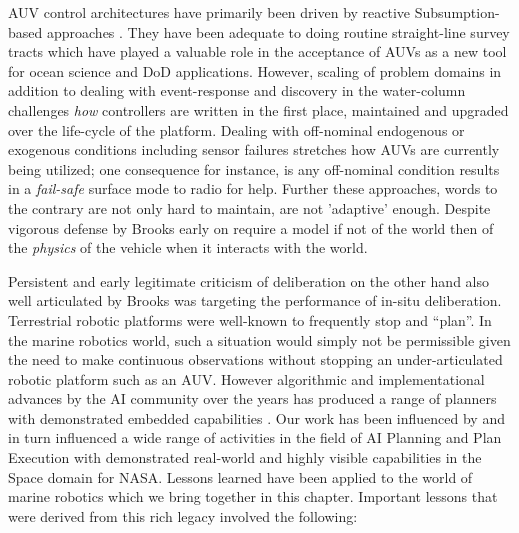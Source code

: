 AUV control architectures have primarily been driven by reactive
Subsumption-based approaches \cite{brooks86}. They have been adequate
to doing routine straight-line survey tracts which have played a
valuable role in the acceptance of AUVs as a new tool for ocean
science and DoD applications. However, scaling of problem domains in
addition to dealing with event-response and discovery in the
water-column challenges \emph{how} controllers are written in the
first place, maintained and upgraded over the life-cycle of the
platform. Dealing with off-nominal endogenous or exogenous conditions
including sensor failures stretches how AUVs are currently being
utilized; one consequence for instance, is any off-nominal condition
results in a \emph{fail-safe} surface mode to radio for help. Further
these approaches, words to the contrary are not only hard to maintain,
are not 'adaptive' enough. Despite vigorous defense by Brooks early on
\cite{Brooks91intelligencewithoutrea,Brooks91intelligencewithoutrep}
require a model if not of the world then of the \emph{physics} of the
vehicle when it interacts with the world.

Persistent and early legitimate criticism of deliberation on the other
hand also well articulated by Brooks
\cite{Brooks91intelligencewithoutrea,Brooks91intelligencewithoutrep}
was targeting the performance of in-situ deliberation. Terrestrial
robotic platforms were well-known to frequently stop and ``plan''. In
the marine robotics world, such a situation would simply not be
permissible given the need to make continuous observations without
stopping an under-articulated robotic platform such as an AUV. However
algorithmic and implementational advances by the AI community over the
years has produced a range of planners with demonstrated embedded
capabilities
\cite{simmons94,Haigh98,alami:1998p820,chien00,mus98,teichteil07}. Our
work has been influenced by and in turn influenced a wide range of
activities in the field of AI Planning and Plan Execution with
demonstrated real-world and highly visible capabilities in the Space
domain \cite{mus98,rajan00,aichang04,bresina05} for NASA. Lessons
learned have been applied to the world of marine robotics which we
bring together in this chapter. Important lessons that were derived
from this rich legacy involved the following:

